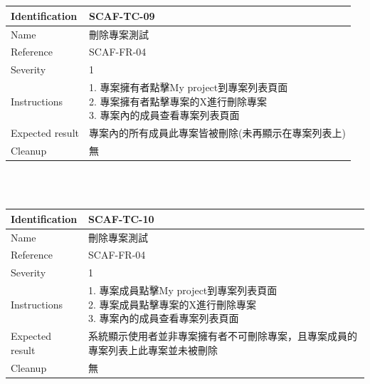 \documentclass{report}
\begin{document}
\\
\newline
\\
\begin{tabularx}{\textwidth}{
  |p{}%
  |p{}|%
  }
  \hline
  \centering Identification &  SCAF-TC-09 \\
  \hline
  \centering Name & 刪除專案測試 \\
  \hline
  \centering Reference & SCAF-FR-04 \\
  \hline
  \centering Severity & 1 \\
  \hline
  \centering Instructions & 
  \makecell[l]{
    1. 專案擁有者點擊My project到專案列表頁面 \\
    2. 專案擁有者點擊專案的X進行刪除專案 \\
    3. 專案內的成員查看專案列表頁面 
  }\\
  \hline
  \centering Expected result & 專案內的所有成員此專案皆被刪除(未再顯示在專案列表上) \\
  \hline
  \centering Cleanup & 無 \\
  \hline
\end{tabularx}
\\
\newline
\\
\begin{tabularx}{\textwidth}{
  |p{}%
  |p{}|%
  }
  \hline
  \centering Identification &  SCAF-TC-10 \\
  \hline
  \centering Name & 刪除專案測試 \\
  \hline
  \centering Reference & SCAF-FR-04 \\
  \hline
  \centering Severity & 1 \\
  \hline
  \centering Instructions & 
  \makecell[l]{
    1. 專案成員點擊My project到專案列表頁面 \\
    2. 專案成員點擊專案的X進行刪除專案 \\
    3. 專案內的成員查看專案列表頁面  
  }\\
  \hline
  \centering Expected result & 系統顯示使用者並非專案擁有者不可刪除專案，且專案成員的專案列表上此專案並未被刪除 \\
  \hline
  \centering Cleanup & 無 \\
  \hline
\end{tabularx}
\\
\end{document}
